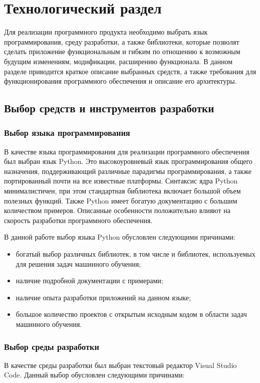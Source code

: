 \chapter{Технологический раздел}
\label{cha:impl}

Для реализации программного продукта необходимо выбрать язык программирования, среду разработки, а также библиотеки, которые позволят сделать приложение функциональным и гибким по отношению к возможным будущим изменениям, модификации, расширению функционала.
В данном разделе приводится краткое описание выбранных средств, а также требования для функционирования программного обеспечения и описание его архитектуры.

\section{Выбор средств и инструментов разработки}
\subsection{Выбор языка программирования}
В качестве языка программирования для реализации программного обеспечения был выбран язык Python. Это высокоуровневый язык программирования общего назначения, поддерживающий различные парадигмы программирования, а также портированный почти на все известные платформы. Синтаксис ядра Python минималистичен, при этом стандартная библиотека включает большой объем полезных функций. Также Python имеет богатую документацию с большим количеством примеров. %
Описанные особенности положительно влияют на скорость разработки программного обеспечения.

В данной работе выбор языка Python обусловлен следующими причинами:
\begin{itemize}
	\item богатый выбор различных библиотек, в том числе и библиотек, используемых для решения задач машинного обучения;
	\item наличие подробной документации с примерами;
	\item наличие опыта разработки приложений на данном языке;
	\item большое количество проектов с открытым исходным кодом в области задач машинного обучения.
\end{itemize}

\subsection{Выбор среды разработки}
В качестве среды разработки был выбран текстовый редактор Visual Studio Code. Данный выбор обусловлен следующими причинами:

